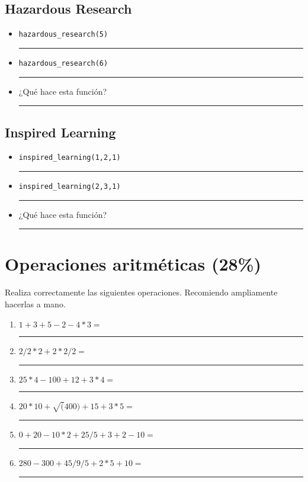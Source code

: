 \documentclass[11pt]{article}
\newcommand{\matlab}[1]{\lstinline[style=Matlab-bw]!#1!}
\newcommand{\shortresponserule}{{\large\rule{5 cm}{0.3mm}}}
\newcommand{\responserule}{{\large\rule{10 cm}{0.3mm}}}
\begin{document}
\pagebreak

\subsection*{Hazardous Research}


\begin{itemize}
    \item \matlab{hazardous_research(5)} \hfill \shortresponserule
    \item \matlab{hazardous_research(6)} \hfill \shortresponserule
    \item ¿Qué hace esta función? \hfill \responserule
\end{itemize}

\subsection*{Inspired Learning}


\begin{itemize}
    \item \matlab{inspired_learning(1,2,1)} \hfill \shortresponserule
    \item \matlab{inspired_learning(2,3,1)} \hfill \shortresponserule
    \item ¿Qué hace esta función? \hfill \responserule
\end{itemize}

\section{Operaciones aritméticas (28\%)}

Realiza correctamente las siguientes operaciones. Recomiendo ampliamente hacerlas a mano.

\begin{enumerate}[label=\alph*)]
    \item $1 + 3 + 5 - 2 - 4 * 3 =$ \hfill \shortresponserule
    \item $2 / 2 * 2 + 2 * 2 / 2 =$ \hfill \shortresponserule
    \item $25 * 4 - 100 + 12 + 3 * 4 =$ \hfill \shortresponserule
    \item $20 * 10 + \sqrt(400) + 15 + 3 * 5 =$ \hfill \shortresponserule
    \item $0 + 20 - 10 * 2 + 25 / 5 + 3 + 2 - 10 =$ \hfill \shortresponserule
    \item $280 - 300 + 45 / 9 / 5 + 2 * 5 + 10 =$ \hfill \shortresponserule
\end{enumerate}
\end{document}
